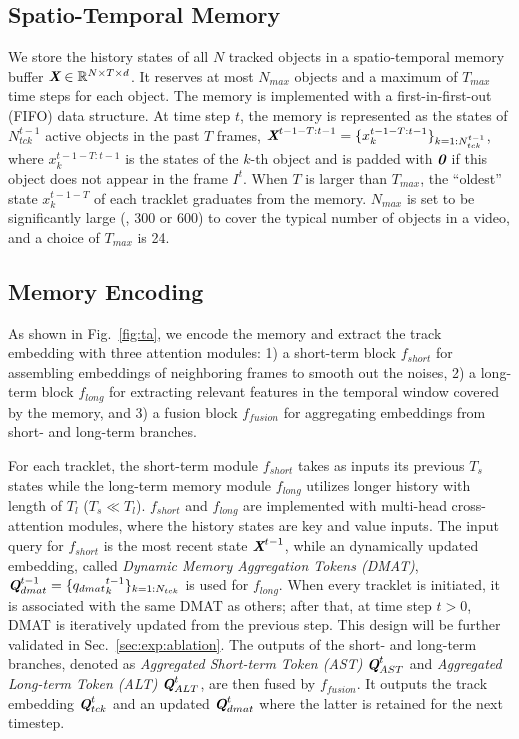 \subsection{Spatio-Temporal Memory}
\label{sec:method:memory}

We store the history states of all $N$ tracked objects in a spatio-temporal memory buffer $\textbf{\em X} \in \mathbb{R}^{N \times T \times d}$.
It reserves at most $N_{max}$ objects and a maximum of $T_{max}$ time steps for each object.
The memory is implemented with a first-in-first-out (FIFO) data structure. 
At time step $t$, the memory is represented as the states of $N_{tck}^{t-1}$ active objects in the past $T$ frames, $\textbf{\em X}^{t-1-T:t-1}=\{x_k^{t-1-T:t-1}\}_{k=1:N_{tck}^{t-1}}$, where $x_k^{t-1-T:t-1}$ is the states of the $k$-th object and is padded with $\textbf{\em 0}$ if this object does not appear in the frame $I^t$.
When $T$ is larger than $T_{max}$, the ``oldest'' state $x_k^{t-1-T}$ of each tracklet graduates from the memory.
$N_{max}$ is set to be significantly large (\eg, 300 or 600) to cover the typical number of objects in a video, and a choice of $T_{max}$ is 24.

\subsection{Memory Encoding}
\label{sec:method:theta_E}

As shown in Fig.~\ref{fig:ta}, we encode the memory and extract the track embedding with three attention modules:
1) a short-term block $f_{short}$ for assembling embeddings of neighboring frames to smooth out the noises,
2) a long-term block $f_{long}$ for extracting relevant features in the temporal window covered by the memory,
and 3) a fusion block $f_{fusion}$ for aggregating embeddings from short- and long-term branches.

For each tracklet, the short-term module $f_{short}$ takes as inputs its previous $T_s$ states while the long-term memory module $f_{long}$ utilizes longer history with length of $T_l$ ($T_s \ll T_l$).
$f_{short}$ and $f_{long}$ are implemented with multi-head cross-attention modules, where the history states are key and value inputs.
The input query for $f_{short}$ is the most recent state $\textbf{\em X}^{t-1}$, while an dynamically updated embedding, called \textit{Dynamic Memory Aggregation Tokens (DMAT)}, $\textbf{\em Q}^{t-1}_{dmat} = \{{q_{dmat}}_k^{t-1}\}_{k=1:N_{tck}}$ is used for $f_{long}$.
When every tracklet is initiated, it is associated with the same DMAT as others; after that, at time step $t > 0$, DMAT is iteratively updated from the previous step. This design will be further validated in Sec.~\ref{sec:exp:ablation}.
The outputs of the short- and long-term branches, denoted as \textit{Aggregated Short-term Token (AST)} $\textbf{\em Q}^t_{AST}$ and \textit{Aggregated Long-term Token (ALT)} $\textbf{\em Q}^t_{ALT}$, are then fused by $f_{fusion}$.
It outputs the track embedding $\textbf{\em Q}_{tck}^t$ and an updated $\textbf{\em Q}^{t}_{dmat}$ where the latter is retained for the next timestep. 

